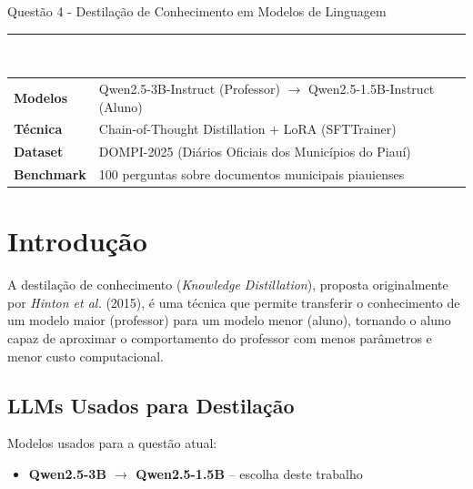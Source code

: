 \documentclass[12pt, a4paper]{article}
\begin{document}

\begin{titlepage}
  \centering
  \vspace*{1cm}
  {\large Questão 4 - Destilação de Conhecimento em Modelos de Linguagem}\\
  \rule{\linewidth}{0.5pt}\\
  \vspace{1.5cm}
  \begin{tabular}{ll}
    \textbf{Modelos}    & Qwen2.5-3B-Instruct (Professor) $\rightarrow$ Qwen2.5-1.5B-Instruct (Aluno) \\[0.3cm]
    \textbf{Técnica}    & Chain-of-Thought Distillation + LoRA (SFTTrainer) \\[0.3cm]
    \textbf{Dataset}    & DOMPI-2025 (Diários Oficiais dos Municípios do Piauí) \\[0.3cm]
    \textbf{Benchmark}  & 100 perguntas sobre documentos municipais piauienses \\
  \end{tabular}
  \vfill
\end{titlepage}

\newpage
\newpage

\section{Introdução}


A destilação de conhecimento (\textit{Knowledge Distillation}), proposta originalmente
por \textit{Hinton et al.} (2015), é uma técnica que permite transferir o conhecimento
de um modelo maior (professor) para um modelo menor (aluno), tornando o aluno capaz de
aproximar o comportamento do professor com menos parâmetros e menor custo computacional.

\subsection{LLMs Usados para Destilação}

Modelos usados para a questão atual:

\begin{itemize}
  \item \textbf{Qwen2.5-3B $\rightarrow$ Qwen2.5-1.5B} -- escolha deste trabalho
\end{itemize}
\end{document}
